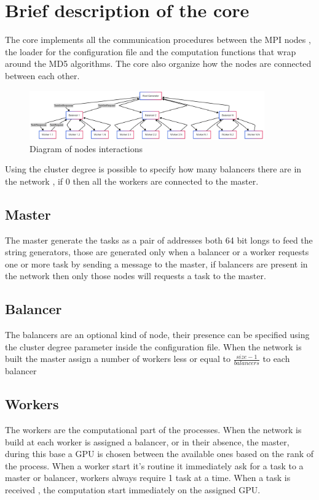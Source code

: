 \documentclass[12pt,a4paper]{article}
\begin{document}
\section{Brief description of the core}
The core implements all the communication procedures between the MPI nodes , the loader for the configuration file and the computation functions that wrap around the MD5 algorithms. The core also organize how the nodes are connected between each other.
\\
\begin{figure}[H]
    \includegraphics[width=0.9\textwidth]{images/diagram_with_balancers.png}
    \caption{Diagram of nodes interactions}
\end{figure}

Using the cluster degree is possible to specify how many balancers there are in the network , if 0 then all the workers are connected to the master. 

\subsection{Master}

The master generate the tasks as a pair of addresses both 64 bit longs to feed the string generators, those are generated only when a balancer or a worker requests one or more task by sending a message to the master, if balancers are present in the network then only those nodes will requests a task to the master.

\subsection{Balancer}
The balancers are an optional kind of node, their presence can be specified using the cluster degree parameter inside the configuration file. When the network is built the master assign a number of workers less or equal to $\frac{size-1}{balancers}$ to each balancer

\subsection{Workers}
The workers are the computational part of the processes. When the network is build at each worker is assigned a balancer, or in their absence, the master, during this base a GPU is chosen between the available ones based on the rank of the process. When a worker start it's routine it immediately ask for a task to a master or balancer, workers always require 1 task at a time. When a task is received , the computation start immediately on the assigned GPU.
\end{document}

